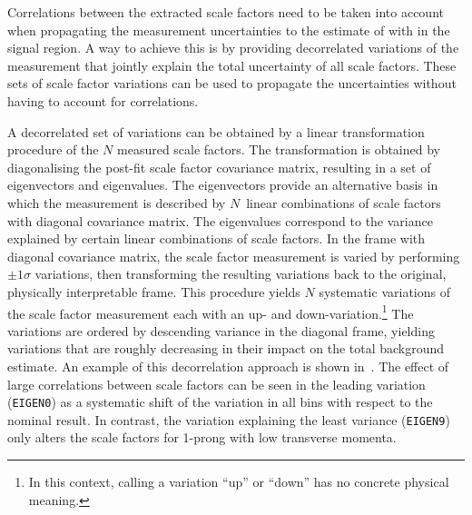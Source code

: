 Correlations between the extracted scale factors need to be taken into
account when propagating the measurement uncertainties to the estimate
of \ttbar with \faketauhadvis in the \hadhad signal region. A way to
achieve this is by providing decorrelated variations of the
measurement that jointly explain the total uncertainty of all scale
factors. These sets of scale factor variations can be used to
propagate the uncertainties without having to account for
correlations.

A decorrelated set of variations can be obtained by a linear
transformation procedure of the $N$ measured scale factors. The
transformation is obtained by diagonalising the post-fit scale factor
covariance matrix, resulting in a set of eigenvectors and
eigenvalues. The eigenvectors provide an alternative basis in which
the measurement is described by $N$~linear combinations of scale
factors with diagonal covariance matrix. The eigenvalues correspond to
the variance explained by certain linear combinations of scale
factors. %
In the frame with diagonal covariance matrix, the scale factor
measurement is varied by performing $\pm 1 \sigma$ variations, then
transforming the resulting variations back to the original, physically
interpretable frame. This procedure yields $N$ systematic variations
of the scale factor measurement each with an up- and
down-variation.\footnote{In this context, calling a variation ``up''
  or ``down'' has no concrete physical meaning.} The variations are
ordered by descending variance in the diagonal frame, yielding
variations that are roughly decreasing in their impact on the total
\ttbarFakes background estimate. An example of this decorrelation
approach is shown in~. The effect of
large correlations between scale factors can be seen in the leading
variation (\texttt{EIGEN0}) as a systematic shift of the variation in
all bins with respect to the nominal result. In contrast, the
variation explaining the least variance (\texttt{EIGEN9}) only alters
the scale factors for 1-prong \faketauhadvis with low transverse
momenta.

